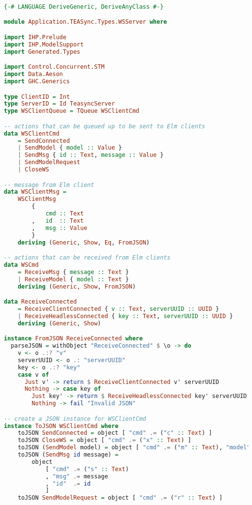\begin{lstlisting}[language=Haskell, caption=TEASync Backend server (WSServer.hs), label=lst:java]
    
{-# LANGUAGE DeriveGeneric, DeriveAnyClass #-}

module Application.TEASync.Types.WSServer where

import IHP.Prelude
import IHP.ModelSupport
import Generated.Types

import Control.Concurrent.STM
import Data.Aeson
import GHC.Generics

type ClientID = Int
type ServerID = Id TeasyncServer
type WSClientQueue = TQueue WSClientCmd

-- actions that can be queued up to be sent to Elm clients
data WSClientCmd 
    = SendConnected
    | SendModel { model :: Value }
    | SendMsg { id :: Text, message :: Value }
    | SendModelRequest
    | CloseWS

-- message from Elm client
data WSClientMsg =
    WSClientMsg
        {
            cmd :: Text
        ,   id  :: Text
        ,   msg :: Value
        }
    deriving (Generic, Show, Eq, FromJSON)

-- actions that can be received from Elm clients
data WSCmd
    = ReceiveMsg { message :: Text }
    | ReceiveModel { model :: Text }
    deriving (Generic, Show, FromJSON)

data ReceiveConnected
    = ReceiveClientConnected { v :: Text, serverUUID :: UUID }
    | ReceiveHeadlessConnected { key :: Text, serverUUID :: UUID }
    deriving (Generic, Show)

instance FromJSON ReceiveConnected where
  parseJSON = withObject "ReceiveConnected" $ \o -> do
    v <- o .:? "v"
    serverUUID <- o .: "serverUUID"
    key <- o .:? "key"
    case v of
      Just v' -> return $ ReceiveClientConnected v' serverUUID
      Nothing -> case key of
        Just key' -> return $ ReceiveHeadlessConnected key' serverUUID
        Nothing -> fail "Invalid JSON"

-- create a JSON instance for WSClientCmd
instance ToJSON WSClientCmd where
    toJSON SendConnected = object [ "cmd" .= ("c" :: Text) ]
    toJSON CloseWS = object [ "cmd" .= ("x" :: Text) ]
    toJSON (SendModel model) = object [ "cmd" .= ("m" :: Text), "model" .= model ]
    toJSON (SendMsg id message) = 
        object 
            [ "cmd" .= ("s" :: Text)
            , "msg" .= message 
            , "id"  .= id
            ]
    toJSON SendModelRequest = object [ "cmd" .= ("r" :: Text) ]



\end{lstlisting}
